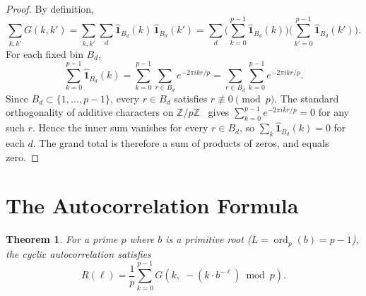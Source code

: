 \documentclass[12pt]{amsart}
\newtheorem{theorem}{Theorem}
\theoremstyle{definition}
\theoremstyle{remark}
\begin{document}
\begin{proof}
By definition,
\[
\sum_{k, k'} G(k, k')
= \sum_{k, k'} \sum_d
\widehat{\mathbf{1}}_{B_d}(k)\,
\widehat{\mathbf{1}}_{B_d}(k')
= \sum_d \biggl(\sum_{k=0}^{p-1}
\widehat{\mathbf{1}}_{B_d}(k)\biggr)
\biggl(\sum_{k'=0}^{p-1}
\widehat{\mathbf{1}}_{B_d}(k')\biggr).
\]
For each fixed bin $B_d$,
\[
\sum_{k=0}^{p-1} \widehat{\mathbf{1}}_{B_d}(k)
= \sum_{k=0}^{p-1} \sum_{r \in B_d} e^{-2\pi i k r / p}
= \sum_{r \in B_d} \sum_{k=0}^{p-1} e^{-2\pi i k r / p}.
\]
Since $B_d \subset \{1, \ldots, p{-}1\}$, every $r \in B_d$
satisfies $r \not\equiv 0 \pmod p$. The standard
orthogonality of additive characters on
$\mathbb{Z}/p\mathbb{Z}$~\cite{iwaniec} gives
$\sum_{k=0}^{p-1} e^{-2\pi i k r / p} = 0$ for any such
$r$. Hence the inner sum vanishes for every $r \in B_d$, so
$\sum_k \widehat{\mathbf{1}}_{B_d}(k) = 0$ for each $d$.
The grand total is therefore a sum of products of zeros,
and equals zero.
\end{proof}

\section{The Autocorrelation Formula}

\begin{theorem}\label{thm:autocorrelation}
For a prime $p$ where $b$ is a primitive root
($L = \operatorname{ord}_p(b) = p{-}1$), the cyclic
autocorrelation satisfies
\[
R(\ell) = \frac{1}{p}
\sum_{k=0}^{p-1}
G\!\left(k,\; -(k \cdot b^{-\ell}) \bmod p\right).
\]
\end{theorem}
\end{document}
